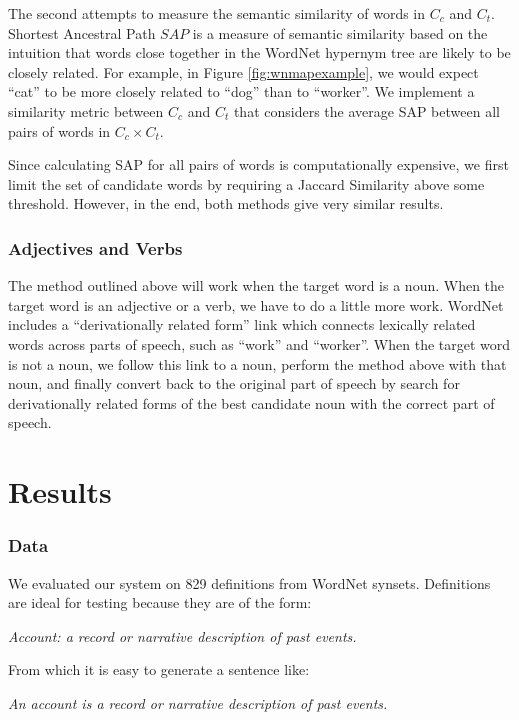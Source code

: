 \documentclass[12pt]{article}
\begin{document}
The second attempts to measure the semantic similarity of words in $C_c$ and $C_t$. Shortest Ancestral Path \(SAP\) is a measure of semantic similarity based on the intuition that words close together in the WordNet hypernym tree are likely to be closely related. For example, in Figure \ref{fig:wnmapexample}, we would expect ``cat'' to be more closely related to ``dog'' than to ``worker''. We implement a similarity metric between $C_c$ and $C_t$ that considers the average SAP between all pairs of words in $C_c \times C_t$.

Since calculating SAP for all pairs of words is computationally expensive, we first limit the set of candidate words by requiring a Jaccard Similarity above some threshold. However, in the end, both methods give very similar results.

\subsubsection{Adjectives and Verbs}

The method outlined above will work when the target word is a noun. When the target word is an adjective or a verb, we have to do a little more work. WordNet includes a ``derivationally related form'' link which connects lexically related words across parts of speech, such as ``work'' and ``worker''. When the target word is not a noun, we follow this link to a noun, perform the method above with that noun, and finally convert back to the original part of speech by search for derivationally related forms of the best candidate noun with the correct part of speech.

\section{Results}

\subsubsection{Data}
We evaluated our system on 829 definitions from WordNet synsets. Definitions are ideal for testing because they are of the form:

\begin{center}
    \emph{Account: a record or narrative description of past events.}
\end{center}

From which it is easy to generate a sentence like:

\begin{center}
    \emph{An account is a record or narrative description of past events.}
\end{center}
\end{document}
